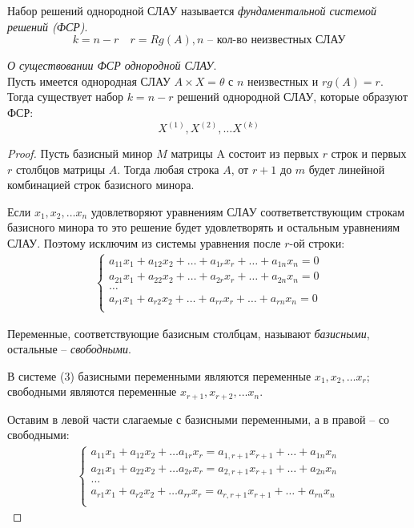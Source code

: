 \begin{definition}
  Набор решений однородной СЛАУ называется \textit{фундаментальной системой решений (ФСР)}.\[
  k = n - r \quad r = Rg(A), n \text{ -- кол-во неизвестных СЛАУ}
  \] 
\end{definition}

\begin{theorem}
  \textit{О существовании ФСР однородной СЛАУ}. \\
  Пусть имеется однородная СЛАУ $A \times X = \theta$ с $n$ неизвестных и $rg(A) = r$. \\
  Тогда существует набор  $k = n - r$ решений однородной СЛАУ, которые образуют ФСР:  \[
    X^{(1)}, X^{(2)}, \ldots X^{(k)}
  \] 
\end{theorem}
\begin{proof}
  Пусть базисный минор $M$ матрицы A состоит из первых $r$ строк и первых $r$ столбцов матрицы $A$.
  Тогда любая строка $A$, от $r+1$ до $m$ будет линейной комбинацией строк базисного минора.

  Если  $x_1, x_2, \ldots x_{n}$ удовлетворяют уравнениям СЛАУ соответветствующим строкам базисного минора то это решение будет удовлетворять и остальным уравнениям СЛАУ.
  Поэтому исключим из системы уравнения после $r$-ой строки:
  \begin{gather*}
    \begin{cases}
      a_{11} x_1 + a_{12} x_2 + \ldots + a_{1r} x_r + \ldots + a_{1n} x_{n} = 0 \\
      a_{21} x_1 + a_{22} x_2 + \ldots + a_{2r} x_r + \ldots + a_{2n} x_{n} = 0 \\
      \ldots \\
      a_{r1} x_1 + a_{r2} x_2 + \ldots + a_{rr} x_r + \ldots + a_{rn} x_{n} = 0 \\
    \end{cases} \tag{3} 
  \end{gather*}

  Переменные, соответствующие базисным столбцам, называют \textit{базисными}, остальные -- \textit{свободными}.

  В системе (3) базисными переменными являются переменные $x_1, x_2, \ldots x_r$; свободными являются переменные $x_{r+1}, x_{r+2}, \ldots x_n$.

  Оставим в левой части слагаемые с базисными переменными, а в правой -- со свободными:
  \begin{gather*}
    \begin{cases}
      a_{11} x_1 + a_{12} x_2 + \ldots a_{1r} x_r = a_{1,r+1} x_{r+1} + \ldots + a_{1n} x_{n} \\ 
      a_{21} x_1 + a_{22} x_2 + \ldots a_{2r} x_r = a_{2,r+1} x_{r+1} + \ldots + a_{2n} x_{n} \\ 
      \ldots \\
      a_{r1} x_1 + a_{r2} x_2 + \ldots a_{rr} x_r = a_{r,r+1} x_{r+1} + \ldots + a_{rn} x_{n} \\ 
    \end{cases} \tag{4} 
  \end{gather*}


\end{proof}
